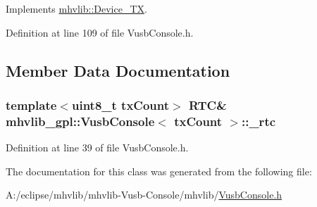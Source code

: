 Implements \hyperlink{classmhvlib_1_1_device___t_x_aa9a0eb462357b51beb7072d8003b8959}{mhvlib\-::\-Device\-\_\-\-T\-X}.



Definition at line 109 of file Vusb\-Console.\-h.



\subsection{Member Data Documentation}
\hypertarget{classmhvlib__gpl_1_1_vusb_console_afa40652faf990471baaaf8859cc2d398}{
\subsubsection[{\-\_\-rtc}]{\setlength{\rightskip}{0pt plus 5cm}template$<$uint8\-\_\-t tx\-Count$>$ {\bf R\-T\-C}\& {\bf mhvlib\-\_\-gpl\-::\-Vusb\-Console}$<$ tx\-Count $>$\-::\-\_\-rtc\hspace{0.3cm}{\ttfamily [protected]}}}\label{classmhvlib__gpl_1_1_vusb_console_afa40652faf990471baaaf8859cc2d398}


Definition at line 39 of file Vusb\-Console.\-h.



The documentation for this class was generated from the following file\-:\begin{DoxyCompactItemize}
\item 
A\-:/eclipse/mhvlib/mhvlib-\/\-Vusb-\/\-Console/mhvlib/\hyperlink{_vusb_console_8h}{Vusb\-Console.\-h}\end{DoxyCompactItemize}
